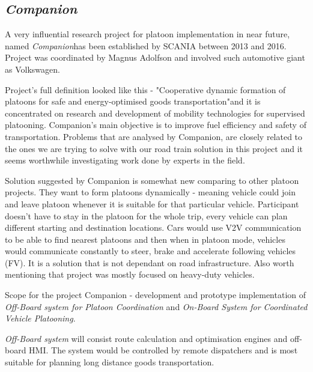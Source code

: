 \subsection{\textit{Companion}}
% 
A very influential research project for platoon implementation in near future, named \emph{Companion}\footnotemark has been established by SCANIA between 2013 and 2016. Project was coordinated by Magnus Adolfson and involved such automotive giant as Volkswagen.\par
% 
% 
Project's full definition looked like this - "Cooperative dynamic formation of platoons for safe and energy-optimised goods transportation"\footnotemark and it is concentrated on research and development of mobility technologies for supervised platooning. Companion's main objective is to improve fuel efficiency and safety of transportation.%
% 
%
% 
Problems that are analysed by Companion, are closely related to the ones we are trying to solve with our road train solution in this project and it seems worthwhile investigating work done by experts in the field\footnotemark.\par
% 
% 
Solution suggested by Companion is somewhat new comparing to other platoon projects. They want to form platoons dynamically - meaning vehicle could join and leave platoon whenever it is suitable for that particular vehicle. Participant doesn't have to stay in the platoon for the whole trip, every vehicle can plan different starting and destination locations. Cars would use V2V communication to be able to find nearest platoons and then when in platoon mode, vehicles would communicate constantly to steer, brake and accelerate following vehicles (FV). It is a solution that is not dependant on road infrastructure. Also worth mentioning that project was mostly focused on heavy-duty vehicles.\par
% 
% 
Scope for the project Companion - development and prototype implementation of \emph{Off-Board system for Platoon Coordination} and \emph{On-Board System for Coordinated Vehicle Platooning}.\par
% 
% 
\emph{Off-Board system} will consist route calculation and optimisation engines and off-board HMI. The system would be controlled by remote dispatchers and is most suitable for planning long distance goods transportation.\par
